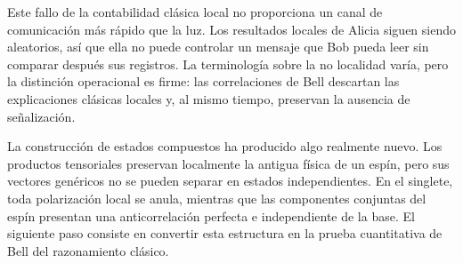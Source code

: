 Este fallo de la contabilidad clásica local no proporciona un canal de comunicación más rápido que la luz. Los resultados locales de Alicia siguen siendo aleatorios, así que ella no puede controlar un mensaje que Bob pueda leer sin comparar después sus registros. La terminología sobre la no localidad varía, pero la distinción operacional es firme: las correlaciones de Bell descartan las explicaciones clásicas locales y, al mismo tiempo, preservan la ausencia de señalización.

La construcción de estados compuestos ha producido algo realmente nuevo. Los productos tensoriales preservan localmente la antigua física de un espín, pero sus vectores genéricos no se pueden separar en estados independientes. En el singlete, toda polarización local se anula, mientras que las componentes conjuntas del espín presentan una anticorrelación perfecta e independiente de la base. El siguiente paso consiste en convertir esta estructura en la prueba cuantitativa de Bell del razonamiento clásico.
